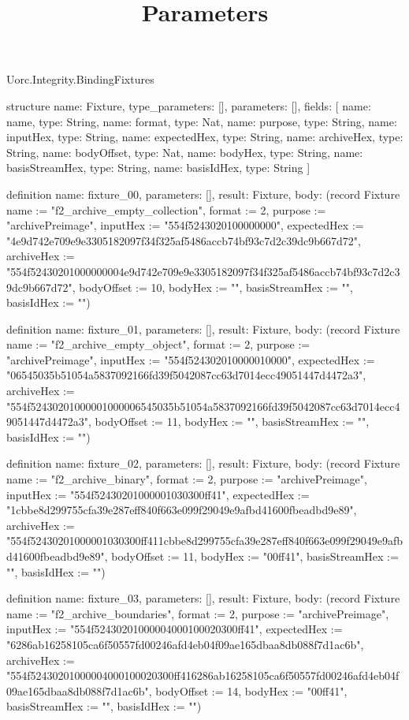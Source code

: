 \begin{lexlean}{Uorc.Integrity.BindingFixtures}
\title{Parameters}
\begin{semanticmodule}
structure{
  name: Fixture,
  type_parameters: [],
  parameters: [],
  fields: [
    {name: name, type: String},
    {name: format, type: Nat},
    {name: purpose, type: String},
    {name: inputHex, type: String},
    {name: expectedHex, type: String},
    {name: archiveHex, type: String},
    {name: bodyOffset, type: Nat},
    {name: bodyHex, type: String},
    {name: basisStreamHex, type: String},
    {name: basisIdHex, type: String}
  ]
}

definition{
  name: fixture_00,
  parameters: [],
  result: Fixture,
  body: (record Fixture {name := "f2_archive_empty_collection", format := 2, purpose := "archivePreimage", inputHex := "554f5243020100000000", expectedHex := "4e9d742e709e9e3305182097f34f325af5486accb74bf93c7d2c39dc9b667d72", archiveHex := "554f52430201000000004e9d742e709e9e3305182097f34f325af5486accb74bf93c7d2c39dc9b667d72", bodyOffset := 10, bodyHex := "", basisStreamHex := "", basisIdHex := ""})
}

definition{
  name: fixture_01,
  parameters: [],
  result: Fixture,
  body: (record Fixture {name := "f2_archive_empty_object", format := 2, purpose := "archivePreimage", inputHex := "554f524302010000010000", expectedHex := "06545035b51054a5837092166fd39f5042087cc63d7014ecc49051447d4472a3", archiveHex := "554f52430201000001000006545035b51054a5837092166fd39f5042087cc63d7014ecc49051447d4472a3", bodyOffset := 11, bodyHex := "", basisStreamHex := "", basisIdHex := ""})
}

definition{
  name: fixture_02,
  parameters: [],
  result: Fixture,
  body: (record Fixture {name := "f2_archive_binary", format := 2, purpose := "archivePreimage", inputHex := "554f52430201000001030300ff41", expectedHex := "1cbbe8d299755cfa39e287eff840f663e099f29049e9afbd41600fbeadbd9e89", archiveHex := "554f52430201000001030300ff411cbbe8d299755cfa39e287eff840f663e099f29049e9afbd41600fbeadbd9e89", bodyOffset := 11, bodyHex := "00ff41", basisStreamHex := "", basisIdHex := ""})
}

definition{
  name: fixture_03,
  parameters: [],
  result: Fixture,
  body: (record Fixture {name := "f2_archive_boundaries", format := 2, purpose := "archivePreimage", inputHex := "554f52430201000004000100020300ff41", expectedHex := "6286ab16258105ca6f50557fd00246afd4eb04f09ae165dbaa8db088f7d1ac6b", archiveHex := "554f52430201000004000100020300ff416286ab16258105ca6f50557fd00246afd4eb04f09ae165dbaa8db088f7d1ac6b", bodyOffset := 14, bodyHex := "00ff41", basisStreamHex := "", basisIdHex := ""})
}


\end{semanticmodule}
\end{lexlean}
